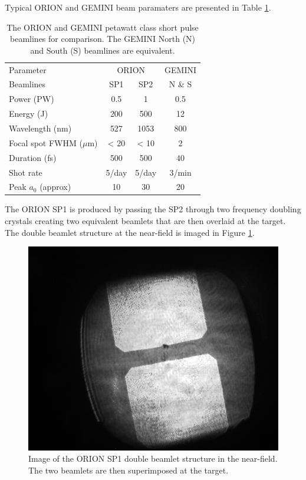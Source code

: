 Typical ORION and GEMINI beam paramaters are presented in Table \ref{tab:laser_params}.
\begin{table}[]
	\centering
	\begin{tabular}{lccc}
		\hline \hline
		Parameter                & \multicolumn{2}{c}{ORION} & GEMINI \\ 
		Beamlines                & SP1         & SP2         & N \& S  \\ \hline
		Power (PW)               & 0.5         & 1           & 0.5    \\
		Energy (J)               & 200         & 500         & 12     \\
		Wavelength (nm)          & 527         & 1053        & 800    \\
		Focal spot FWHM ($\mu$m) & < 20        & < 10        & 2      \\
		Duration (fs)            & 500         & 500         & 40     \\
		Shot rate                & 5/day       & 5/day       & 3/min  \\
		Peak $a_0$ (approx)      & 10          & 30          & 20    \\ \hline \hline
	\end{tabular}
	\caption{The ORION and GEMINI petawatt class short pulse beamlines for comparison. The GEMINI North (N) and South (S) beamlines are equivalent.}
	\label{tab:laser_params}
\end{table}
The ORION SP1 is produced by passing the SP2 through two frequency doubling crystals creating two equivalent beamlets that are then overlaid at the target. The double beamlet structure at the near-field is imaged in Figure \ref{fig:oriondoublebeamletsnearfield}.
\begin{figure}
	\centering
	\includegraphics[width=0.5\linewidth]{figures/orion/orion_doublebeamlets_near_field}
	\caption[Image of the ORION SP1 double beamlet structure in the near-field.]{Image of the ORION SP1 double beamlet structure in the near-field. The two beamlets are then superimposed at the target.}
	\label{fig:oriondoublebeamletsnearfield}
\end{figure}

